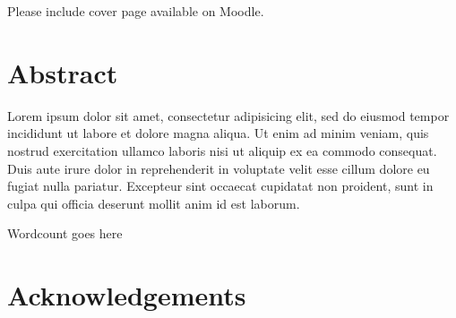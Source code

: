 \documentclass[11pt, twoside]{report}
\begin{document}

\vspace*{\fill}
\begingroup
\centering


Please include cover page available on Moodle. 


\endgroup
\vspace*{\fill}

\chapter*{Abstract}
Lorem ipsum dolor sit amet, consectetur adipisicing elit, sed do eiusmod
tempor incididunt ut labore et dolore magna aliqua. Ut enim ad minim veniam,
quis nostrud exercitation ullamco laboris nisi ut aliquip ex ea commodo
consequat. Duis aute irure dolor in reprehenderit in voluptate velit esse
cillum dolore eu fugiat nulla pariatur. Excepteur sint occaecat cupidatat non proident, sunt in culpa qui officia deserunt mollit anim id est laborum.

Wordcount goes here


\chapter*{Acknowledgements}


\tableofcontents

\listoffigures

\cleardoublepage
{}














\nocite{*} %






\end{document}
